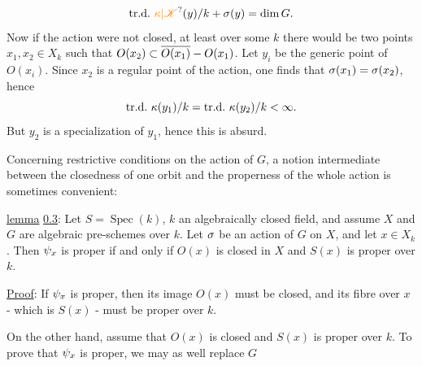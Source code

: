 
\[
\mathrm{tr.d.}\ \handwritten{\unsure{\kappa|\mathscr K}}(y)/k+\handwritten{\sigma}(y)=\dim G.
\]
Now if the action were not closed, at least over some $k$ there would be two points $x_1,x_2\in X_k$ such that $O(x_2)\subset\overline{O(x_1)}-O(x_1)$. Let $y_i$ be the generic point of $O(x_i)$. Since $x_2$ is a regular point of the action, one finds that $\sigma(x_1)=\sigma(x_2)$, hence
\[
\mathrm{tr.d.}\ \handwritten{\kappa}(y_1)/k=\mathrm{tr.d.}\ \handwritten{\kappa}(y_2)/k<\handwritten{\infty}.
\]
But $y_2$ is a specialization of $y_1$, hence this is absurd.

Concerning restrictive conditions on the action of $G$, a notion intermediate between the closedness of one orbit and the properness of the whole action is sometimes convenient:

\uline{lemma} \uline{0.3}: Let $S=\operatorname{Spec}(k)$, $k$ an algebraically closed field, and assume $X$ and $G$ are algebraic pre-schemes over $k$. Let $\sigma$ be an action of $G$ on $X$, and let $x\in X_k$. Then $\psi_x$ is proper if and only if $O(x)$ is closed in $X$ and $S(x)$ is proper over $k$.

\uline{Proof}: If $\psi_x$ is proper, then its image $O(x)$ must be closed, and its fibre over $x$ - which is $S(x)$ - must be proper over $k$.

On the other hand, assume that $O(x)$ is closed and $S(x)$ is proper over $k$. To prove that $\psi_x$ is proper, we may as well replace $G$

